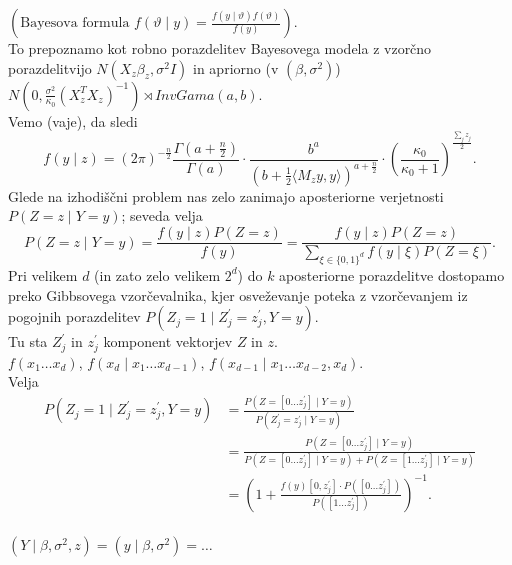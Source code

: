 \documentclass[a4paper, 12pt]{book}
\theoremstyle{definition}
\theoremstyle{remark}
\begin{document}
$\left( \text{Bayesova formula } f(\vartheta \mid y) = \frac{f(y \mid \vartheta) f(\vartheta)}{f(y)} \right)$. \\
To prepoznamo kot robno porazdelitev Bayesovega modela z vzorčno porazdelitvijo $N(X_z \beta_z, \sigma^2 I)$
in apriorno (v $(\beta, \sigma^2)$) $N\left(0, \frac{\sigma^2}{\kappa_0} (X_z^T X_z)^{-1}\right) \rtimes InvGama(a, b)$. \\
Vemo (vaje), da sledi \\
\begin{equation*}
  f(y \mid z) = (2\pi)^{-\frac{n}{2}} \frac{\Gamma\left(a + \frac{n}{2}\right)}{\Gamma(a)} \cdot
    \frac{b^a}{\left(b + \frac{1}{2} \langle M_z y, y\rangle\right)^{a+\frac{n}{2}}}
    \cdot \left(\frac{\kappa_0}{\kappa_0+1}\right)^{\frac{\sum_j z_j}{2}}.
\end{equation*}
Glede na izhodiščni problem nas zelo zanimajo aposteriorne verjetnosti \\
$P(Z=z \mid Y=y)$;
seveda velja
\begin{equation*}
  P(Z=z \mid Y=y) = \frac{f(y \mid z) P(Z=z)}{f(y)} = \frac{f(y \mid z) P(Z=z)}{\sum_{\xi \in \{0,1\}^d} f(y \mid \xi) P(Z=\xi)}.
\end{equation*}
Pri velikem $d$ (in zato zelo velikem $2^d$) do $k$ aposteriorne porazdelitve dostopamo preko Gibbsovega vzorčevalnika,
kjer osveževanje poteka z vzorčevanjem iz pogojnih porazdelitev $P(Z_j=1 \mid Z_j^{'}=z_j^{'}, Y=y)$. \\
Tu sta $Z_j^{'}$ in $z_j^{'}$  komponent vektorjev $Z$ in $z$. \\
$f(x_1 \dots x_d)$, $f(x_d \mid x_1 \dots x_{d-1})$, $f(x_{d-1} \mid x_1 \dots x_{d-2}, x_d)$. \\
Velja 
\begin{align*}
  P(Z_j=1 \mid Z_j^{'}=z_j^{'}, Y=y)
  &= \frac{P(Z=[0 \dots z_j^{'}] \mid Y=y)}{P(Z_j^{'}=z_j^{'} \mid Y=y)} \\
  &= \frac{P(Z=[0 \dots z_j^{'}] \mid Y=y)}{P(Z=[0 \dots z_j^{'}] \mid Y=y) + P(Z=[1 \dots z_j^{'}] \mid Y=y)} \\
  &= \left(1 + \frac{f(y) [0, z_j^{'}] \cdot P([0 \dots z_j^{'}])}{P([1 \dots z_j^{'}])}\right)^{-1}.
\end{align*}
 \\
$(Y \mid \beta, \sigma^2, z) = (y \mid \beta, \sigma^2) = \dots$



%
%



\end{document}

